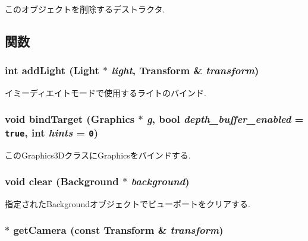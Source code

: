 このオブジェクトを削除するデストラクタ. 

\subsection{関数}
\hypertarget{classm3g_1_1Graphics3D_e210cacb72c8540df86a6674e3c2dc4f}{
\subsubsection[{addLight}]{\setlength{\rightskip}{0pt plus 5cm}int addLight ({\bf Light} $\ast$ {\em light}, \/  {\bf Transform} \& {\em transform})}}
\label{classm3g_1_1Graphics3D_e210cacb72c8540df86a6674e3c2dc4f}


イミーディエイトモードで使用するライトのバインド. \hypertarget{classm3g_1_1Graphics3D_2173e179f4b2d7130cde46a48794ee66}{
\subsubsection[{bindTarget}]{\setlength{\rightskip}{0pt plus 5cm}void bindTarget ({\bf Graphics} $\ast$ {\em g}, \/  bool {\em depth\_\-buffer\_\-enabled} = {\tt true}, \/  int {\em hints} = {\tt 0})}}
\label{classm3g_1_1Graphics3D_2173e179f4b2d7130cde46a48794ee66}


このGraphics3DクラスにGraphicsをバインドする. \hypertarget{classm3g_1_1Graphics3D_21c4a68a53cfbe0a7cec05d5a56682bf}{
\subsubsection[{clear}]{\setlength{\rightskip}{0pt plus 5cm}void clear ({\bf Background} $\ast$ {\em background})}}
\label{classm3g_1_1Graphics3D_21c4a68a53cfbe0a7cec05d5a56682bf}


指定されたBackgroundオブジェクトでビューポートをクリアする. \hypertarget{classm3g_1_1Graphics3D_570b81f426d1b2b5e8794cffb33422c6}{
\subsubsection[{getCamera}]{ $\ast$ getCamera (const {\bf Transform} \& {\em transform})}}
\label{classm3g_1_1Graphics3D_570b81f426d1b2b5e8794cffb33422c6}


